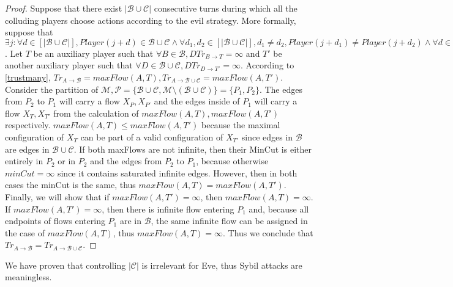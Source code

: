 \documentclass[11pt]{article}
\theoremstyle{definition}
\theoremstyle{corollary}
\theoremstyle{lemma}
\begin{document}
    \begin{proof}
       Suppose that there exist $|\mathcal{B} \cup \mathcal{C}|$ consecutive turns during which all the colluding players
       choose actions according to the evil strategy. More formally, suppose that $\exists j: \forall d \in [|\mathcal{B}
       \cup \mathcal{C}|], Player(j+d) \in \mathcal{B} \cup \mathcal{C} \wedge \forall d_1, d_2 \in [|\mathcal{B} \cup
       \mathcal{C}|], d_1 \neq d_2, Player(j + d_1) \neq Player(j + d_2) \wedge \forall d \in [|\mathcal{B} \cup
       \mathcal{C}|], Strategy(Player(j+d)) = Evil$. Let $T$ be an auxiliary player such that $\forall B \in \mathcal{B},
       DTr_{B \rightarrow T} = \infty$ and $T'$ be another auxiliary player such that $\forall D \in \mathcal{B} \cup
       \mathcal{C}, DTr_{D \rightarrow T'} = \infty$. According to \ref{trustmany}, $Tr_{A \rightarrow \mathcal{B}} =
       maxFlow(A, T), Tr_{A \rightarrow \mathcal{B} \cup \mathcal{C}} = maxFlow(A, T')$. Consider the partition of
       $\mathcal{M}, \mathcal{P} = \{\mathcal{B} \cup \mathcal{C}, \mathcal{M} \setminus (\mathcal{B} \cup \mathcal{C})\} =
       \{P_1, P_2\}$. The edges from $P_2$ to $P_1$ will carry a flow $X_P, X_{P'}$ and the edges inside of $P_1$ will carry
       a flow $X_T, X_{T'}$ from the calculation of $maxFlow(A, T), maxFlow(A, T')$ respectively. $maxFlow(A, T) \leq
       maxFlow(A, T')$ because the maximal configuration of $X_T$ can be part of a valid configuration of $X_{T'}$ since
       edges in $\mathcal{B}$ are edges in $\mathcal{B} \cup \mathcal{C}$. If both maxFlows are not infinite, then their
       MinCut is either entirely in $P_2$ or in $P_2$ and the edges from $P_2$ to $P_1$, because otherwise $minCut = \infty$
       since it contains saturated infinite edges. However, then in both cases the minCut is the same, thus $maxFlow(A, T) =
       maxFlow(A, T')$. Finally, we will show that if $maxFlow(A, T') = \infty$, then $maxFlow(A, T) = \infty$. If
       $maxFlow(A, T') = \infty$, then there is infinite flow entering $P_1$ and, because all endpoints of flows entering
       $P_1$ are in $\mathcal{B}$, the same infinite flow can be assigned in the case of $maxFlow(A, T)$, thus
       $maxFlow(A, T) = \infty$. Thus we conclude that $Tr_{A \rightarrow \mathcal{B}} =
       Tr_{A \rightarrow \mathcal{B} \cup \mathcal{C}}$.
       
       
    \end{proof}
    We have proven that controlling $|\mathcal{C}|$ is irrelevant for Eve, thus Sybil attacks are meaningless. \\
\end{document}
